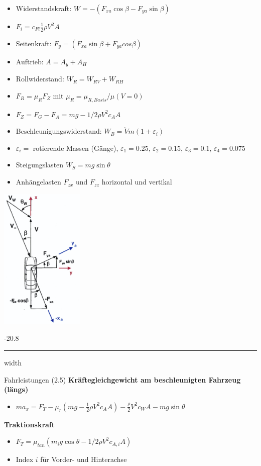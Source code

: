 \documentclass[8pt, landscape, fleqn]{scrartcl}
\makeatletter
\renewcommand{\subsubsection}{\@startsection{subsubsection}{1}{0mm}%
{-2\baselineskip}{0.8\baselineskip}%
{\hrule depth 0.2pt width\columnwidth\vspace*{1.2em}\normalsize\bfseries\rmfamily}}
\makeatother
\begin{document}
\begin{multicols*}{3}
    \begin{itemize}
        \item Widerstandskraft: $W= -(F_{xa}\cos{\beta}- F_{ya}\sin{\beta})$
        \item $F_i = c_{Fi}\frac{1}{2}\rho V^2 A $
        \item Seitenkraft: $F_y = (F_{xa} \sin{\beta}+ F_{ya}cos{\beta})$ 
        \item Auftrieb: $A = A_y + A_H$
        \item Rollwiderstand: $W_R = W_{RV} + W_{RH}$
        \item $F_R = \mu_R F_Z$ mit $\mu_R = \mu_{R, Basis} / \mu(V=0)$
        \item $F_Z = F_G - F_A = mg - 1/2\rho V^2 c_A A$
        \item Beschleunigungswiderstand: $W_B = \dot{V}m(1+\varepsilon_i)$
        \item $\varepsilon_i =$ rotierende Massen (Gänge), $\varepsilon_1 = 0.25$, $\varepsilon_2 = 0.15$, $\varepsilon_3 = 0.1$, $\varepsilon_4 = 0.075$
        \item Steigungslasten $W_S = mg \sin\theta$
        \item Anhängelasten $F_{zx}$ und $F_{zz}$ horizontal und vertikal
    \end{itemize}


    \begin{center}
        \includegraphics[width=4cm]{Koordinaten_Schraegstroemung.png}
    \end{center}


\subsubsection{Fahrleistungen (2.5)}
\textbf{Kräftegleichgewicht am beschleunigten Fahrzeug (längs)} 
\begin{itemize}
    \item $m a_x = F_T - \mu_r (mg - \frac{1}{2}\rho V^2 c_A A) - \frac{\rho}{2} V^2 c_W A- mg \sin\theta$
\end{itemize}
\textbf{Traktionskraft}
\begin{itemize}
    \item $F_T = \mu_{tan} (m_i g \cos\theta -1/2 \rho V^2 c_{A,i}A)$
    \item Index $i$ für Vorder- und Hinterachse
\end{itemize}


\end{multicols*}
\end{document}
